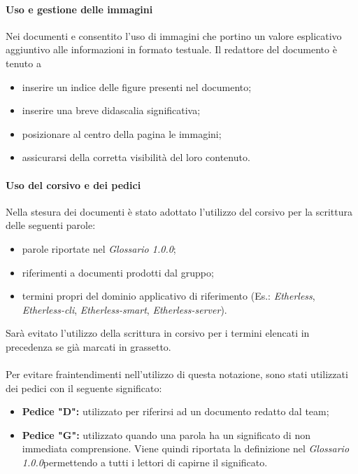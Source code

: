   \paragraph{Uso e gestione delle immagini}
  Nei documenti e consentito l'uso di immagini che portino un valore esplicativo
  aggiuntivo alle informazioni in formato testuale. Il redattore del documento è tenuto a
  \begin{itemize}
  	\item inserire un indice delle figure presenti nel documento;
  	\item inserire una breve didascalia significativa;
  	\item posizionare al centro della pagina le immagini;
  	\item assicurarsi della corretta visibilità del loro contenuto.
  \end{itemize}  

  \paragraph{Uso del corsivo e dei pedici}
  Nella stesura dei documenti è stato adottato l'utilizzo del corsivo per la scrittura delle seguenti parole:
  \begin{itemize}
  	\item parole riportate nel \textit{Glossario 1.0.0\docs};
  	\item riferimenti a documenti prodotti dal gruppo;
  	\item termini propri del dominio applicativo di riferimento (Es.: \textit{Etherless}, \textit{Etherless-cli}, \textit{Etherless-smart}, \textit{Etherless-server}).
  \end{itemize} 
  Sarà evitato l'utilizzo della scrittura in corsivo per i termini elencati in precedenza se già marcati in grassetto.\\\\
  Per evitare fraintendimenti nell'utilizzo di questa notazione, sono stati utilizzati dei pedici con il seguente significato:
    \begin{itemize}
      \item \textbf{Pedice "D":} utilizzato per riferirsi ad un documento redatto dal team;
      \item \textbf{Pedice "G":} utilizzato quando una parola ha un significato
      di non immediata comprensione. Viene quindi riportata la definizione nel
      \textit{Glossario 1.0.0}\doc permettendo a tutti i lettori di capirne il significato.
    \end{itemize}


